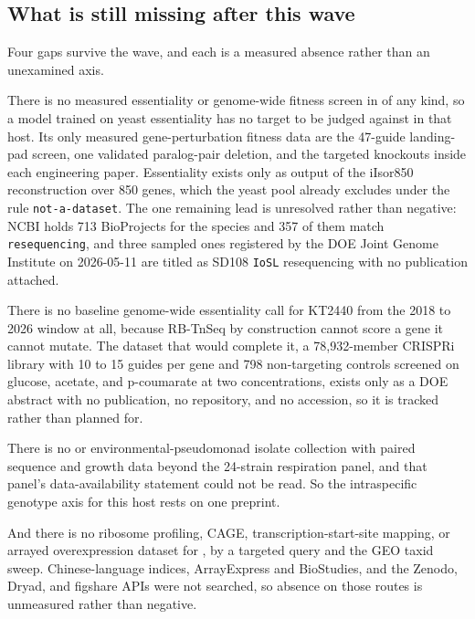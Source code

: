 \subsection{What is still missing after this wave}\label{sec:state-gaps}

Four gaps survive the wave, and each is a measured absence rather than an unexamined axis.

There is no measured essentiality or genome-wide fitness screen in  of
any kind, so a model trained on yeast essentiality has no target to be judged against in that
host. Its only measured gene-perturbation fitness data are the 47-guide landing-pad screen,
one validated paralog-pair deletion, and the targeted knockouts inside each engineering paper.
Essentiality exists only as output of the iIsor850 reconstruction over 850 genes, which the
yeast pool already excludes under the rule \texttt{not-a-dataset}. The one remaining lead is
unresolved rather than negative: NCBI holds 713 BioProjects for the species and 357 of them
match \texttt{resequencing}, and three sampled ones registered by the DOE Joint Genome
Institute on 2026-05-11 are titled as SD108 \texttt{IoSL} resequencing with no publication
attached.

There is no baseline genome-wide essentiality call for KT2440 from the 2018 to 2026 window at
all, because RB-TnSeq by construction cannot score a gene it cannot mutate. The dataset that
would complete it, a 78,932-member CRISPRi library with 10 to 15 guides per gene and 798
non-targeting controls screened on glucose, acetate, and p-coumarate at two concentrations,
exists only as a DOE abstract with no publication, no repository, and no accession, so it is
tracked rather than planned for.

There is no  or environmental-pseudomonad isolate collection with paired
sequence and growth data beyond the 24-strain respiration panel, and that panel's
data-availability statement could not be read. So the intraspecific genotype axis for this host
rests on one preprint.

And there is no ribosome profiling, CAGE, transcription-start-site mapping, or arrayed
overexpression dataset for , by a targeted query and the GEO taxid sweep.
Chinese-language indices, ArrayExpress and BioStudies, and the Zenodo, Dryad, and figshare
APIs were not searched, so absence on those routes is unmeasured rather than negative.
